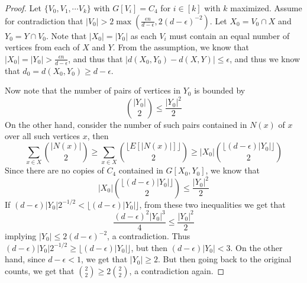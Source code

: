 \documentclass[12pt]{article}
\begin{document}
\begin{proof} Let $\{ V_0, V_1, \cdots V_k\}$ with $G[V_i] = C_4$ for
  $i \in [k]$ with $k$ maximized. Assume for contradiction that
  $|V_0| > 2 \max(\frac{\epsilon n}{d - \epsilon},
  2{(d-\epsilon)}^{-2})$. Let $X_0 = V_0 \cap X$ and
  $Y_0 = Y \cap V_0$. Note that $|X_0| = |Y_0|$ as each $V_i$ must
  contain an equal number of vertices from each of $X$ and $Y$. From
  the assumption, we know that
  $|X_0| = |Y_0| > \frac{\epsilon n}{d - \epsilon}$, and thus that
  $|d(X_0, Y_0) - d(X, Y)| \leq \epsilon$, and thus we know that
  $d_0 = d(X_0, Y_0) \geq d - \epsilon$.

  Now note that the number of pairs of vertices in $Y_0$ is bounded by
  \[
    {|Y_0| \choose 2 } \leq \dfrac{|Y_0|^2}{2}
  \]
  On the other hand, consider the number of such pairs contained in
  $N(x)$ of $x$ over all such vertices $x$, then
  \[
    \sum_{x \in X} {|N(x)| \choose 2} \geq \sum_{x \in X} {\lfloor
      E[|N(x)|] \rfloor \choose 2 } \geq |X_0| {\lfloor (d - \epsilon)
      |Y_0| \rfloor \choose 2}
  \]
  Since there are no copies of $C_4$ contained in $G[X_0, Y_0]$, we
  know that
  \[
    |X_0| {\lfloor (d - \epsilon) |Y_0| \rfloor \choose 2}\leq
    \dfrac{|Y_0|^2}{2}
  \]
  If
  $(d - \epsilon) |Y_0| 2^{-1/2} < \lfloor (d - \epsilon) |Y_0|
  \rfloor$, from these two inequalities we get that
  \[
    \dfrac{{(d - \epsilon)}^2 |Y_0|^3}{4} \leq \dfrac{|Y_0|^2}{2}
  \]
  implying $|Y_0| \leq 2{(d - \epsilon)}^{-2}$, a contradiction.  Thus
  $(d - \epsilon) |Y_0| 2^{-1/2} \geq \lfloor (d - \epsilon) |Y_0|
  \rfloor$, but then $(d - \epsilon) |Y_0| < 3$. On the other hand,
  since $d-\epsilon < 1$, we get that $|Y_0| \geq 2$. But then going
  back to the original counts, we get that
  ${2 \choose 2} \geq 2 {2 \choose 2}$, a contradiction again.
\end{proof}
\end{document}
